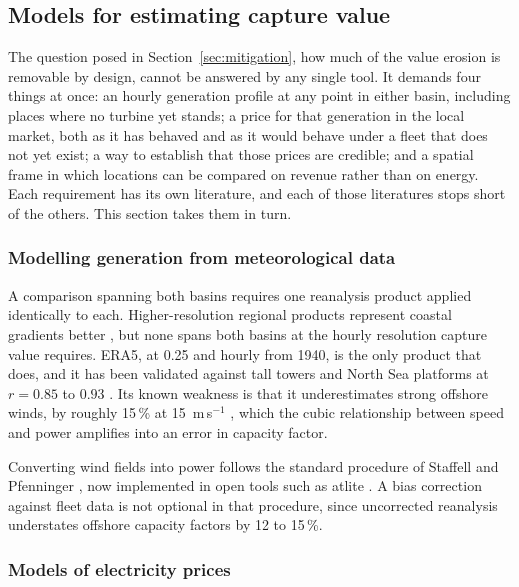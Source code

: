 \subsection{Models for estimating capture value}\label{sec:modelling}

The question posed in Section~\ref{sec:mitigation}, how much of the value
erosion is removable by design, cannot be answered by any single tool. It
demands four things at once: an hourly generation profile at any point in either
basin, including places where no turbine yet stands; a price for that generation
in the local market, both as it has behaved and as it would behave under a fleet
that does not yet exist; a way to establish that those prices are credible; and a
spatial frame in which locations can be compared on revenue rather than on
energy. Each requirement has its own literature, and each of those literatures stops
short of the others. This section takes them in turn.

\subsubsection{Modelling generation from meteorological data}

A comparison spanning both basins requires one reanalysis product applied
identically to each. Higher-resolution regional products represent coastal
gradients better \cite{Solbrekke2022, Spangehl2021}, but none spans both basins
at the hourly resolution capture value requires. ERA5, at 0.25\textdegree{} and
hourly from 1940, is the only product that does, and it has been validated
against tall towers \cite{Staffell2016, Ramon2019} and North Sea platforms at
$r = 0.85$ to $0.93$ \cite{Bot2024}. Its known weakness is that it
underestimates strong offshore winds, by roughly 15\,\% at 15~m\,s$^{-1}$
\cite{Gandoin2024}, which the cubic relationship between speed and power
amplifies into an error in capacity factor.

Converting wind fields into power follows the standard procedure of Staffell and
Pfenninger \cite{Staffell2016}, now implemented in open tools such as atlite
\cite{Hofmann2021}. A bias correction against fleet data is not optional in that
procedure, since uncorrected reanalysis understates offshore capacity factors by
12 to 15\,\%.

\subsubsection{Models of electricity prices}

